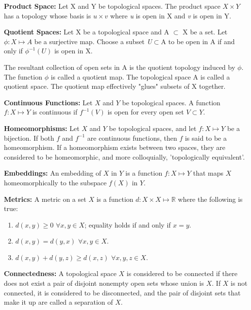 \documentclass[letterpaper,12pt]{article}
\begin{document}
	\textbf{Product Space:}
		Let X and Y be topological spaces. The product space $X\times Y$ has a topology whose basis is {$u\times v$ where \emph{u} is open in X and \emph{v} is open in Y}.
	\newline{}

	\textbf{Quotient Spaces:}
		Let X be a topological space and A $\subset$ X be a set. Let $\phi:X\mapsto A$ be a surjective map. Choose a subset \emph{U}$\subset$A to be open in A if and only if $\phi^{-1}(U)$ is open in X.

		The resultant collection of open sets in A is the quotient topology induced by $\phi$. The function $\phi$ is called a quotient map. The topological space A is called a quotient space. The quotient map effectively "glues" subsets of X together.
	\newline{}

	\textbf{Continuous Functions:}
		Let $X$ and $Y$ be topological spaces. A function $f:X\mapsto Y$ is continuous if $f^{-1}(V)$ is open for every open set $V\subset Y$.
	\newline{}

	\textbf{Homeomorphisms:}
		Let $X$ and $Y$ be topological spaces, and let $f:X\mapsto Y$ be a bijection. If both $f$ and $f^{-1}$ are continuous functions, then $f$ is said to be a homeomorphism. If a homeomorphism exists between two spaces, they are considered to be homeomorphic, and more colloquially, 'topologically equivalent'.
	\newline{}

	\textbf{Embeddings:}
		An embedding of $X$ in $Y$ is a function $f:X\mapsto Y$ that maps $X$ homeomorphically to the subspace $f(X)$ in $Y$.
	\newline{}

	\textbf{Metrics:}
		A metric on a set $X$ is a function $d:X\times X\mapsto\mathbb{R}$ where the following is true:
		\begin{enumerate}
			\item $d(x,y)\geq0$ $\forall x,y\in X$; equality holds if and only if $x=y$.
			\item $d(x,y)=d(y,x)$ $\forall x,y\in X$.
			\item $d(x,y)+d(y,z)\geq d(x,z)$ $\forall x,y,z\in X$.
		\end{enumerate}

	\textbf{Connectedness:}
		A topological space $X$ is considered to be connected if there does not exist a pair of disjoint nonempty open sets whose union is $X$. If $X$ is not connected, it is considered to be disconnected, and the pair of disjoint sets that make it up are called a separation of $X$.
	\newline{}
\end{document}

